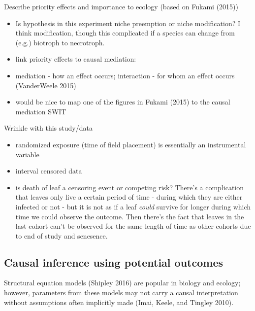 \documentclass[]{article}
\providecommand{\tightlist}{%
  \setlength{\itemsep}{0pt}\setlength{\parskip}{0pt}}
\begin{document}
Describe priority effects and importance to ecology (based on Fukami
(2015))

\begin{itemize}
\tightlist
\item
  Is hypothesis in this experiment niche preemption or niche
  modification? I think modification, though this complicated if a
  species can change from (e.g.) biotroph to necrotroph.
\item
  link priority effects to causal mediation:
\item
  mediation - how an effect occurs; interaction - for whom an effect
  occurs (VanderWeele 2015)
\item
  would be nice to map one of the figures in Fukami (2015) to the causal
  mediation SWIT
\end{itemize}

Wrinkle with this study/data

\begin{itemize}
\tightlist
\item
  randomized exposure (time of field placement) is essentially an
  instrumental variable
\item
  interval censored data
\item
  is death of leaf a censoring event or competing risk? There's a
  complication that leaves only live a certain period of time - during
  which they are either infected or not - but it is not as if a leaf
  \emph{could} survive for longer during which time we could observe the
  outcome. Then there's the fact that leaves in the last cohort can't be
  observed for the same length of time as other cohorts due to end of
  study and senesence.
\end{itemize}

\subsection{Causal inference using potential
outcomes}\label{causal-inference-using-potential-outcomes}

Structural equation models (Shipley 2016) are popular in biology and
ecology; however, parameters from these models may not carry a causal
interpretation without assumptions often implicitly made (Imai, Keele,
and Tingley 2010).
\end{document}
